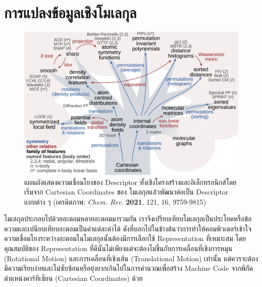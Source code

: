 \section{การแปลงข้อมูลเชิงโมเลกุล}
\label{sec:mol_transform}

\begin{figure}[htbp]
    \centering
    \includegraphics[width=\linewidth]{fig/qm_descriptors_map.jpeg}
    \caption{แผนผังแสดงความเชื่อมโยงของ Descriptor ทั้งเชิงโครงสร้างและอิเล็กทรอนิกส์โดยเริ่มจาก Cartesian Coordinates ของ%
    โมเลกุลแล้วพัฒนาต่อเป็น Descriptor แบบต่าง ๆ
    (เครดิตภาพ: \textit{Chem. Rev.} \textbf{2021}, 121, 16, 9759-9815\autocite{musil2021})}
    \label{fig:qm_descriptor_map}
\end{figure}

โมเลกุลประกอบไปด้วยอะตอมหลายอะตอมมารวมกัน เราจึงเปรียบเทียบโมเลกุลเป็นประโยคหรือข้อความและเปนียบเทียบอะตอมเป็นคำแต่ละคำได้
ดังที่บอกไปในข้างต้นว่าการทำให้คอมพิวเตอร์เข้าใจความเชื่อมโยงระหว่างอะตอมในโมเลกุลนั้นต้องมีการเลือกใช้ Representation ที่เหมาะสม
โดยคุณสมบัติของ Representation ที่ดีนั้นไม่เพียงแต่จะต้องไม่ขึ้นกับการเคลื่อนที่เชิงการหมุน (Rotational Motion) และการเคลื่อนที่เชิงเส้น 
(Translational Motion) เท่านั้น แต่ควรจะต้องมีความเรียบง่ายและไม่ซับซ้อนหรือยุ่งยากเกินไปในการคำนวณเพื่อสร้าง Machine Code 
จากพิกัดตำแหน่งคาร์ทีเซียน (Cartesian Coordinates) ด้วย

